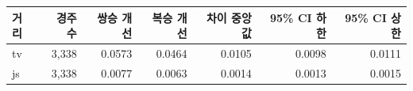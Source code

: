\begin{tabular}{lrrrrrr}
\toprule
거리 & 경주 수 & 쌍승 개선 & 복승 개선 & 차이 중앙값 & 95\% CI 하한 & 95\% CI 상한 \\
\midrule
tv & 3,338 & 0.0573 & 0.0464 & 0.0105 & 0.0098 & 0.0111 \\
js & 3,338 & 0.0077 & 0.0063 & 0.0014 & 0.0013 & 0.0015 \\
\bottomrule
\end{tabular}

